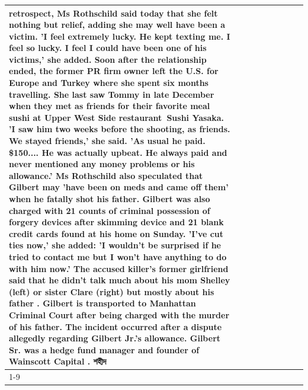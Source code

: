 \begin{table}[H]
\begin{tabular}{lllrlllll}
retrospect, Ms Rothschild said today that she felt nothing but relief, adding she may well have been a victim. 'I feel extremely lucky. He kept texting me. I feel so lucky. I feel I could have been one of his victims,' she added. Soon after the relationship ended, the former PR firm owner left the U.S. for Europe and Turkey where she spent six months  travelling. She last saw Tommy in late December when they met as friends for their favorite meal sushi at Upper West Side restaurant Sushi Yasaka. 'I saw him two weeks before the shooting, as friends. We stayed friends,' she said. 'As usual he paid. \$150.... He was actually upbeat. He always paid and never mentioned any money problems or his allowance.' Ms Rothschild also speculated that Gilbert may 'have been on meds and came off them' when he fatally shot his father. Gilbert was also charged with 21 counts of criminal possession of forgery devices after skimming device and 21 blank credit cards found at his home on Sunday. 'I've cut ties now,' she added: 'I wouldn’t be surprised if he tried to contact me but I won’t have anything to do with him now.' The accused killer's former girlfriend said that he didn't talk much about his mom Shelley (left) or sister Clare (right) but mostly about his father . Gilbert is transported to Manhattan Criminal Court  after being charged with the murder of his father. The incident occurred after a dispute allegedly regarding Gilbert Jr.'s allowance. Gilbert Sr. was a hedge fund manager and founder of Wainscott Capital . শহীদ \\
\cline{1-9}

\end{tabular}
\end{table}
